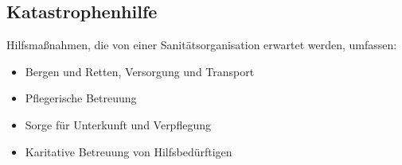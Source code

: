 % 

\subsection{Katastrophenhilfe}

Hilfsmaßnahmen, die von einer Sanitätsorganisation erwartet
werden, umfassen:

\begin{itemize}
\item Bergen und Retten, Versorgung und Transport 
\item Pflegerische Betreuung 
\item Sorge für Unterkunft und Verpflegung 
\item Karitative Betreuung von Hilfsbedürftigen
\end{itemize}

